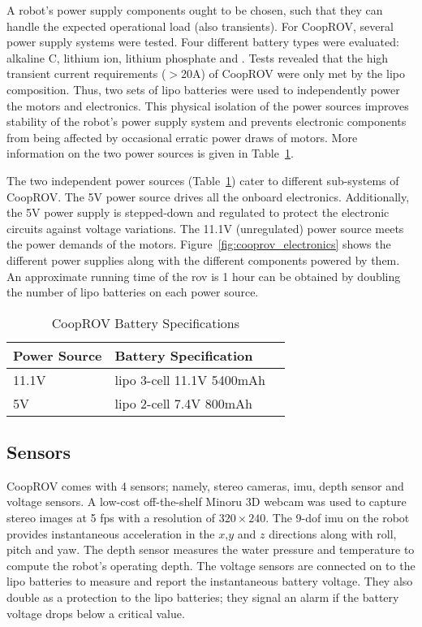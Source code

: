 A robot's power supply components ought to be chosen, such that they can handle the expected operational load (also transients). For CoopROV, several power supply systems were tested. Four different battery types were evaluated: alkaline C, lithium ion, lithium phosphate and . Tests revealed that the high transient current requirements ($>$20A) of CoopROV were only met by the \gls{lipo} composition. Thus, two sets of \gls{lipo} batteries were used to independently power the motors and electronics. This physical isolation of the power sources improves stability of the robot's power supply system and prevents electronic components from being affected by occasional erratic power draws of motors. More information on the two power sources is given in Table~\ref{tab:cooprov_battery}.

The two independent power sources (Table~\ref{tab:cooprov_battery}) cater to different sub-systems of CoopROV. The 5V power source drives all the onboard electronics. Additionally, the 5V power supply is stepped-down and regulated to protect the electronic circuits against voltage variations.  The 11.1V  (unregulated) power source meets the power demands of the motors. Figure~\ref{fig:cooprov_electronics} shows the different power supplies along with the different components powered by them. An approximate running time of the \gls{rov} is 1 hour 
can be obtained by doubling the number of \gls{lipo} batteries on each power source.
%
\begin{table}
\centering
\caption{CoopROV Battery Specifications}
  \begin{tabular}{lll} 
  \toprule
  Power Source	&Battery Specification\\
  \midrule
  11.1V	&\gls{lipo} 3-cell 11.1V 5400mAh\\
  5V	&\gls{lipo} 2-cell 7.4V 800mAh\\
  \bottomrule
  \end{tabular}
  \label{tab:cooprov_battery}
\end{table}


\subsection{Sensors}

CoopROV comes with 4 sensors; namely, stereo cameras, \gls{imu}, depth sensor and voltage sensors. A low-cost off-the-shelf Minoru 3D webcam \cite{minoru} was used to capture stereo images at 5 \gls{fps} with a resolution of $320\times 240$. The 9-\gls{dof} \gls{imu} on the robot provides instantaneous acceleration in the $x$,$y$ and $z$ directions along with roll, pitch and yaw. The depth sensor measures the water pressure and temperature to compute the robot's operating depth. The voltage sensors are connected on to the \gls{lipo} batteries to measure and report the instantaneous battery voltage. They also double as a protection to the \gls{lipo} batteries; they signal an alarm if the battery voltage drops below a critical value.

